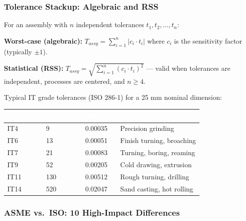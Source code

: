 \documentclass[11pt,letterpaper]{article}
\newcommand{\tableheader}[1]{\textbf{\sffamily\textcolor{white}{#1}}}
\begin{document}
\subsubsection{Tolerance Stackup: Algebraic and RSS}

For an assembly with $n$ independent tolerances $t_1, t_2, \ldots, t_n$:

\textbf{Worst-case (algebraic):} $T_{assy} = \sum_{i=1}^{n} |c_i \cdot t_i|$ where $c_i$ is the sensitivity factor (typically $\pm 1$).

\textbf{Statistical (RSS):} $T_{assy} = \sqrt{\sum_{i=1}^{n} (c_i \cdot t_i)^2}$ --- valid when tolerances are independent, processes are centered, and $n \geq 4$.

Typical IT grade tolerances (ISO 286-1) for a 25 mm nominal dimension:
\begin{center}
\begin{tabularx}{\textwidth}{C{2cm}C{2cm}C{2.5cm}X}
\toprule
{}
\tableheader{IT Grade} & \tableheader{Tol. ($\mu$m)} & \tableheader{Tol. (in)} & \tableheader{Typical Process} \\
\midrule
IT4 & 9 & 0.00035 & Precision grinding \\
IT6 & 13 & 0.00051 & Finish turning, broaching \\
IT7 & 21 & 0.00083 & Turning, boring, reaming \\
IT9 & 52 & 0.00205 & Cold drawing, extrusion \\
IT11 & 130 & 0.00512 & Rough turning, drilling \\
IT14 & 520 & 0.02047 & Sand casting, hot rolling \\
\bottomrule
\end{tabularx}
\end{center}

\subsubsection{ASME vs.\ ISO: 10 High-Impact Differences}
\end{document}
